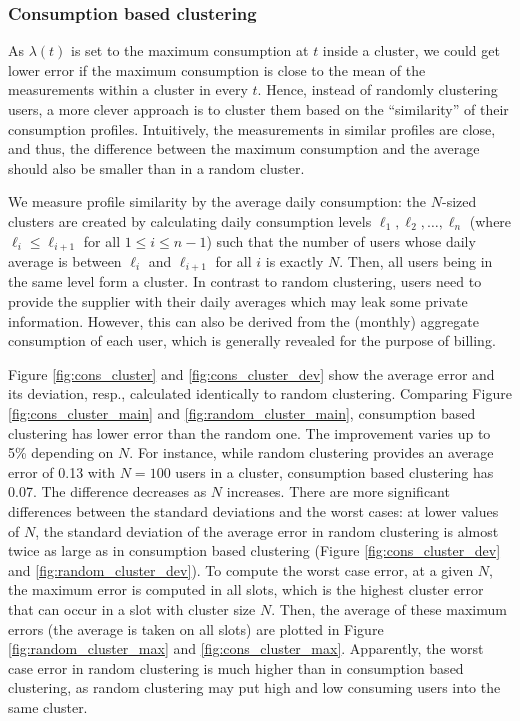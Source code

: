 \documentclass[11pt,a4paper]{article}
\theoremstyle{plain}
\theoremstyle{plain}
\theoremstyle{plain}
\theoremstyle{plain}
\theoremstyle{nonumberplain} \theoremseparator{}
\begin{document}
\subsubsection{Consumption based clustering}

As $\lambda(t)$ is set to the maximum consumption at $t$ inside a cluster, we could get lower error if the maximum consumption is close to the mean of the measurements within a cluster in every $t$. Hence, instead of randomly clustering users, a more clever approach is to cluster them based on the ``similarity'' of their consumption profiles. Intuitively, the measurements in similar profiles are close, and thus, the difference between the maximum consumption and the average should also be smaller than in a random cluster.

We measure profile similarity by the average daily consumption: the $N$-sized clusters are created by calculating daily consumption levels $\ell_1, \ell_2, \ldots, \ell_n$ (where $\ell_i \leq \ell_{i+1}$ for all $1 \leq i \leq n-1$) such that the number of users whose daily average is between $\ell_i$ and $\ell_{i+1}$ for all $i$ is exactly $N$. Then, all users being in the same level form a cluster.  
In contrast to random clustering, users need to provide the supplier with their daily averages which may leak some private information. However, this can also be derived from the (monthly) aggregate consumption of each user, which is generally revealed for the purpose of billing.

Figure \ref{fig:cons_cluster} and \ref{fig:cons_cluster_dev} show the average error and its deviation, resp., calculated identically to random clustering. Comparing Figure \ref{fig:cons_cluster_main} and \ref{fig:random_cluster_main}, consumption based clustering has lower error than the random one. The improvement varies up to 5\% depending on $N$.
For instance, while random clustering provides an average error of 0.13 with $N=100$ users in a cluster, consumption based clustering has 0.07. The difference decreases as $N$ increases. There are more significant  differences between the standard deviations and the worst cases: at lower values of $N$, the standard deviation of the average error in random clustering is almost twice as large as in consumption based clustering (Figure \ref{fig:cons_cluster_dev} and \ref{fig:random_cluster_dev}). To compute the worst case error, at a given $N$, the maximum error is computed in all slots, which is the highest cluster error that can occur in a slot with cluster size $N$. Then, the average of these maximum errors (the average is taken on all slots) are plotted in Figure \ref{fig:random_cluster_max} and \ref{fig:cons_cluster_max}. Apparently, the worst case error in random clustering is much higher than in consumption based clustering, as random clustering may put high and low consuming users into the same cluster.  
\end{document}
